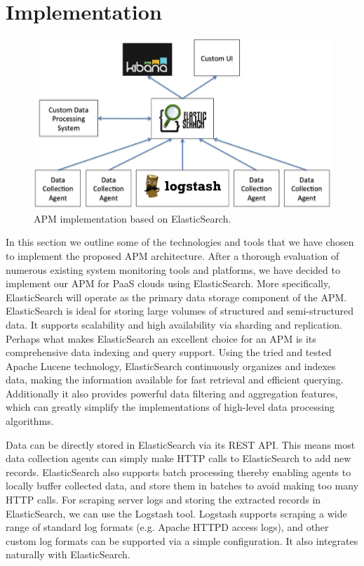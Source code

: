 \documentclass[11pt]{article}
\begin{document}
\section{Implementation}
\begin{figure}
\centering
\includegraphics[scale=0.5]{apm_impl}
\caption{APM implementation based on ElasticSearch.}
\label{fig:apm_impl}
\end{figure}
In this section we outline some of the technologies and tools that we have chosen to implement the proposed
APM architecture.  After a thorough evaluation of numerous existing system monitoring tools and platforms, 
we have decided to implement our APM for PaaS clouds using ElasticSearch. More specifically, ElasticSearch
will operate as the primary data storage component of the APM. ElasticSearch is ideal for storing large volumes
of structured and semi-structured data. It supports scalability and high availability via sharding and replication.
Perhaps what makes ElasticSearch an excellent choice for an APM is its comprehensive data indexing and
query support. Using the tried and tested Apache Lucene technology, ElasticSearch continuously organizes
and indexes data, making the information available for fast retrieval and efficient querying. 
Additionally it also provides
powerful data filtering and aggregation features, which can greatly simplify the implementations of high-level
data processing algorithms.

Data can be directly stored in ElasticSearch via its REST API. This means most data collection agents can 
simply make HTTP calls to ElasticSearch to add new records. ElasticSearch also supports batch 
processing thereby enabling agents to locally buffer collected data, and store them in batches to avoid
making too many HTTP calls. For scraping server logs and storing the extracted records in ElasticSearch,
we can use the Logstash tool. Logstash supports scraping a wide range of standard log formats (e.g. 
Apache HTTPD access logs), and other custom log formats can be supported via a simple configuration.
It also integrates naturally with ElasticSearch.
\end{document}
